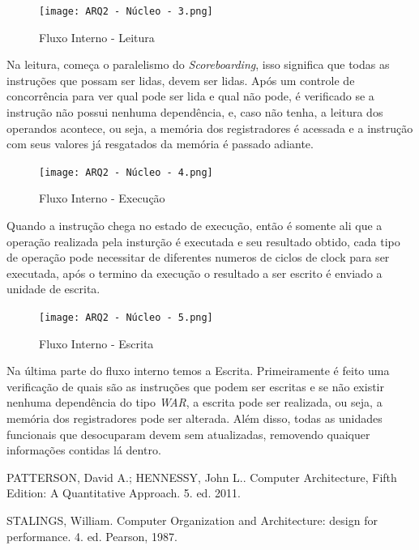 \documentclass[journal]{IEEEtran}
\begin{document}
\begin{figure}[H]
\caption{Fluxo Interno - Leitura}
\centering
\texttt{[image: ARQ2 - Núcleo - 3.png]}
\end{figure}

Na leitura, começa o paralelismo do \textit{Scoreboarding}, isso significa que todas as instruções que possam ser lidas, devem ser lidas. Após um controle de concorrência para ver qual pode ser lida e qual não pode, é verificado se a instrução não possui nenhuma dependência, e, caso não tenha, a leitura dos operandos acontece, ou seja, a memória dos registradores é acessada e a instrução com seus valores já resgatados da memória é passado adiante.

\begin{figure}[H]
\caption{Fluxo Interno - Execução}
\centering
\texttt{[image: ARQ2 - Núcleo - 4.png]}
\end{figure}

Quando a instrução chega no estado de execução, então é somente ali que a operação realizada pela insturção é executada e seu resultado obtido, cada tipo de operação pode necessitar de diferentes numeros de ciclos de clock para ser executada, após o termino da execução o resultado a ser escrito é enviado a unidade de escrita. 

\begin{figure}[H]
\caption{Fluxo Interno - Escrita}
\centering
\texttt{[image: ARQ2 - Núcleo - 5.png]}
\end{figure}

Na última parte do fluxo interno temos a Escrita. Primeiramente é feito uma verificação de quais são as instruções que podem ser escritas e se não existir nenhuma dependência do tipo \textit{WAR}, a escrita pode ser realizada, ou seja, a memória dos registradores pode ser alterada. Além disso, todas as unidades funcionais que desocuparam devem sem atualizadas, removendo quaiquer informações contidas lá dentro.

\begin{thebibliography}{}
\bibitem{} 
PATTERSON, David A.; HENNESSY, John L.. Computer Architecture, Fifth Edition: A Quantitative Approach. 5. ed. 2011.

\bibitem{}
STALINGS, William. Computer Organization and Architecture: design for performance. 4. ed. Pearson, 1987.



\end{thebibliography}
\end{document}
